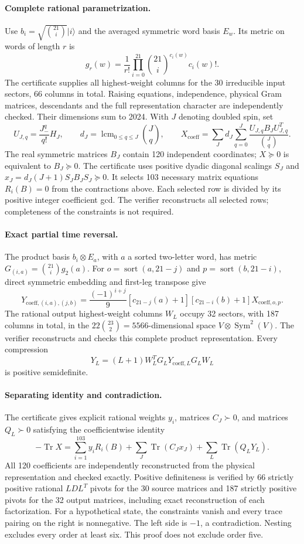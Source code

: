 \documentclass[11pt]{article}
\newcommand{\Tr}{\operatorname{Tr}}
\begin{document}
\paragraph{Complete rational parametrization.}
Use $b_i=\sqrt{\binom{21}{i}}|i\rangle$ and the averaged symmetric word basis $E_w$. Its metric on words of length $r$ is
\[
g_r(w)=\frac1{r!}\prod_{i=0}^{21}\binom{21}{i}^{c_i(w)}c_i(w)!.
\]
The certificate supplies all highest-weight columns for the 30 irreducible input sectors, 66 columns in total. Raising equations, independence, physical Gram matrices, descendants and the full representation character are independently checked. Their dimensions sum to 2024. With $J$ denoting doubled spin, set
\[
U_{J,q}=\frac{J_-^q}{q!}H_J,\qquad d_J=\operatorname{lcm}_{0\le q\le J}\binom Jq,
\qquad
X_{\mathrm{coeff}}=\sum_Jd_J\sum_{q=0}^J\frac{U_{J,q}B_JU_{J,q}^T}{\binom Jq}.
\]
The real symmetric matrices $B_J$ contain 120 independent coordinates; $X\succeq0$ is equivalent to $B_J\succeq0$. The certificate uses positive dyadic diagonal scalings $S_J$ and $x_J=d_J(J+1)S_JB_JS_J\succeq0$. It selects 103 necessary matrix equations $R_i(B)=0$ from the contractions above. Each selected row is divided by its positive integer coefficient gcd. The verifier reconstructs all selected rows; completeness of the constraints is not required.

\paragraph{Exact partial time reversal.}
The product basis $b_i\otimes E_a$, with $a$ a sorted two-letter word, has metric $G_{(i,a)}=\binom{21}{i}g_2(a)$. For $o=\operatorname{sort}(a,21-j)$ and $p=\operatorname{sort}(b,21-i)$, direct symmetric embedding and first-leg transpose give
\[
Y_{\mathrm{coeff},(i,a),(j,b)}=
\frac{(-1)^{i+j}}9[c_{21-j}(a)+1][c_{21-i}(b)+1]X_{\mathrm{coeff},o,p}.
\]
The rational output highest-weight columns $W_L$ occupy 32 sectors, with 187 columns in total, in the $22\binom{23}{2}=5566$-dimensional space $V\otimes\operatorname{Sym}^{2}(V)$. The verifier reconstructs and checks this complete product representation. Every compression
\[
Y_L=(L+1)W_L^TG_LY_{\mathrm{coeff},L}G_LW_L
\]
is positive semidefinite.

\paragraph{Separating identity and contradiction.}
The certificate gives explicit rational weights $y_i$, matrices $C_J\succ0$, and matrices $Q_L\succ0$ satisfying the coefficientwise identity
\[
\boxed{-\Tr X=\sum_{i=1}^{103}y_iR_i(B)+\sum_J\Tr(C_Jx_J)+\sum_L\Tr(Q_LY_L).}
\]
All 120 coefficients are independently reconstructed from the physical representation and checked exactly. Positive definiteness is verified by 66 strictly positive rational $LDL^T$ pivots for the 30 source matrices and 187 strictly positive pivots for the 32 output matrices, including exact reconstruction of each factorization.
For a hypothetical state, the constraints vanish and every trace pairing on the right is nonnegative. The left side is $-1$, a contradiction. Nesting excludes every order at least six. This proof does not exclude order five.
\end{document}
